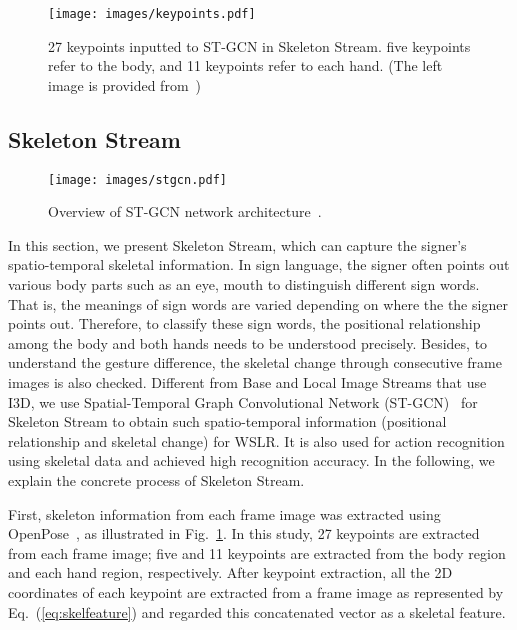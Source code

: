 \documentclass[journal]{IEEEtran}
\begin{document}
\begin{figure}[tb]
  \centering
    \texttt{[image: images/keypoints.pdf]}
    \caption{27 keypoints inputted to ST-GCN in Skeleton Stream. five keypoints refer to the body, and 11 keypoints refer to each hand. (The left image is provided from~\cite{vaezi2019ms-asl})}
    \label{fig:keypoints}
\end{figure}




\subsection{Skeleton Stream}

\begin{figure}[tb]
  \centering
    \texttt{[image: images/stgcn.pdf]}
    \caption{Overview of ST-GCN network architecture~\cite{yan2018stgcn}.}
    \label{fig:stgcn}
\end{figure}

In this section, we present Skeleton Stream, which can capture the signer's spatio-temporal skeletal information. In sign language, the signer often points out various body parts such as an eye, mouth to distinguish different sign words. That is, the meanings of sign words are varied depending on where the the signer points out. Therefore, to classify these sign words, the positional relationship among the body and both hands needs to be understood precisely. Besides, to understand the gesture difference, the skeletal change through consecutive frame images is also checked. Different from Base and Local Image Streams that use I3D, we use Spatial-Temporal Graph Convolutional Network (ST-GCN)~\cite{yan2018stgcn} for Skeleton Stream to obtain such spatio-temporal information (positional relationship and skeletal change) for WSLR. It is also used for action recognition using skeletal data and achieved high recognition accuracy. In the following, we explain the concrete process of Skeleton Stream. 

First, skeleton information from each frame image was extracted using OpenPose~\cite{cao2017openpose}, as illustrated in Fig.~\ref{fig:keypoints}. 
In this study, 27 keypoints are extracted from each frame image;  five and 11 keypoints are extracted from the body region and each hand region, respectively. After keypoint extraction, all the 2D coordinates of each keypoint are extracted from a frame image as represented by Eq.~(\ref{eq:skelfeature}) and regarded this concatenated vector  as a skeletal feature. 
\end{document}
